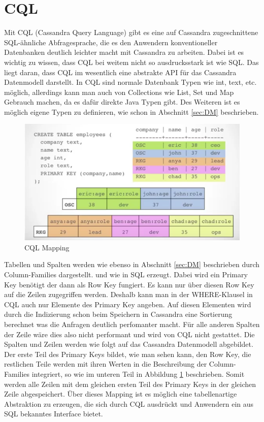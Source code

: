 \section{CQL}
Mit CQL (Cassandra Query Language) gibt es eine auf Cassandra zugeschnittene SQL-ähnliche Abfragesprache, die es den Anwendern konventioneller Datenbanken deutlich leichter macht mit Cassandra zu arbeiten. Dabei ist es wichtig zu wissen, dass CQL bei weitem nicht so ausdrucksstark ist wie SQL. Das liegt daran, dass CQL im wesentlich eine abstrakte API für das Cassandra Datenmodell darstellt. In CQL sind normale Datenbank Typen wie int, text, etc. möglich, allerdings kann man auch von Collections wie List, Set und Map Gebrauch machen, da es dafür direkte Java Typen gibt. Des Weiteren ist es möglich eigene Typen zu definieren, wie schon in Abschnitt \ref{sec:DM} beschrieben.\\
\begin{figure}[htbp!]
	\centering
	\includegraphics[scale=0.7]{pics/cql_mapping.png}
	\caption{CQL Mapping}
	\label{fig:mapping}
\end{figure}
Tabellen und Spalten werden wie ebenso in Abschnitt \ref{sec:DM} beschrieben durch Column-Families dargestellt. und wie in SQL erzeugt. Dabei wird ein Primary Key benötigt der dann als Row Key fungiert. Es kann nur über diesen Row Key auf die Zeilen zugegriffen werden. Deshalb kann man in der WHERE-Klausel in CQL auch nur Elemente des Primary Key angeben. Auf diesen Elementen wird durch die Indizierung schon beim Speichern in Cassandra eine Sortierung berechnet was die Anfragen deutlich perfomanter macht. Für alle anderen Spalten der Zeile wäre dies also nicht performant und wird von CQL nicht gestattet. Die Spalten und Zeilen werden wie folgt auf das Cassandra Datenmodell abgebildet.\\
Der erste Teil des Primary Keys bildet, wie man sehen kann, den Row Key, die restlichen Teile werden mit ihren Werten in die Beschreibung der Column-Families integriert, so wie im unteren Teil in Abbildung \ref{fig:mapping} beschrieben. Somit werden alle Zeilen mit dem gleichen ersten Teil des Primary Keys in der gleichen Zeile abgespeichert. Über dieses Mapping ist es möglich eine tabellenartige Abstraktion zu erzeugen, die sich durch CQL ausdrückt und Anwendern ein aus SQL bekanntes Interface bietet.
